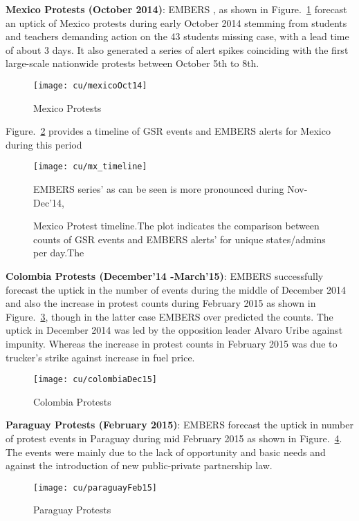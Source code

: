 \textbf{Mexico Protests (October 2014)}:
EMBERS , as shown in Figure.~\ref{fig:mexicoOct14} forecast an uptick of Mexico
protests during early October 2014 stemming from students and teachers demanding
action on the 43 students missing case, with a lead time of about 3
days. It also generated  a series of alert spikes coinciding with the first
large-scale nationwide protests between October 5th to 8th.

\begin{figure}[H]
\texttt{[image: cu/mexicoOct14]}
\caption{Mexico Protests}
\label{fig:mexicoOct14}
\end{figure}

Figure.~\ref{fig:mexicoTimeline} provides a timeline of GSR events and
EMBERS alerts for Mexico during this period
\begin{figure}[H]
\texttt{[image: cu/mx\_timeline]}
\caption{Mexico Protest timeline.The plot indicates the comparison between counts of GSR events
and EMBERS alerts’ for unique states/admins per day.The  }
EMBERS series’ as can be seen is more pronounced during Nov-Dec’14,
\label{fig:mexicoTimeline}
\end{figure}

\textbf{Colombia Protests (December'14 -March'15)}:
EMBERS successfully forecast the uptick in the number of events during the
middle of December 2014 and also the increase in protest counts during February
2015 as shown in Figure.~\ref{fig:colombiaDec14}, though in the latter case EMBERS over predicted the counts. The uptick in
December 2014 was led by the opposition leader Alvaro Uribe against impunity.
Whereas the increase in  protest counts in February 2015
was due to trucker’s strike against increase in fuel price.

\begin{figure}[H]
\texttt{[image: cu/colombiaDec15]}
\caption{Colombia Protests}
\label{fig:colombiaDec14}
\end{figure}

\textbf{Paraguay Protests (February 2015)}:
EMBERS forecast the uptick in number of protest events in Paraguay during mid
February 2015 as shown in Figure.~\ref{fig:paraguay15}. The events were mainly due to the lack of opportunity and basic
needs and against the introduction of new public-private partnership law.

\begin{figure}[H]
\texttt{[image: cu/paraguayFeb15]}
\caption{Paraguay Protests}
\label{fig:paraguay15}
\end{figure}


